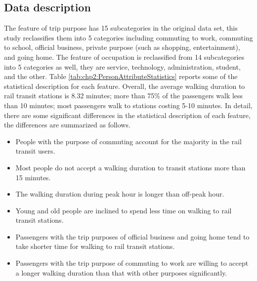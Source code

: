 \subsection{Data description}
The feature of trip purpose has 15 subcategories in the original data set, this study reclassifies them into 5 categories including commuting to work, commuting to school, official business, private purpose (such as shopping, entertainment), and going home. The feature of occupation is reclassified from 14 subcategories into 5 categories as well, they are service, technology, administration, student, and the other. Table \ref{tab:chp2:PersonAttributeStatistics} reports some of the statistical description for each feature. Overall, the average walking duration to rail transit stations is 8.32 minutes; more than 75\% of the passengers walk less than 10 minutes; most passengers walk to stations costing 5-10 minutes. In detail, there are some significant differences in the statistical description of each feature, the differences are summarized as follows.

%
\begin{itemize}
	\setlength{\parskip}{0\baselineskip} %
	\item People with the purpose of commuting account for the majority in the rail transit users.
	\item Most people do not accept a walking duration to transit stations more than 15 minutes.
	\item The walking duration during peak hour is longer than off-peak hour.
	\item Young and old people are inclined to spend less time on walking to rail transit stations.
	\item Passengers with the trip purposes of official business and going home tend to take shorter time for walking to rail transit stations.
	\item Passengers with the trip purpose of commuting to work are willing to accept a longer walking duration than that with other purposes significantly.
	\setlength{\parskip}{0.7\baselineskip} %
\end{itemize}


